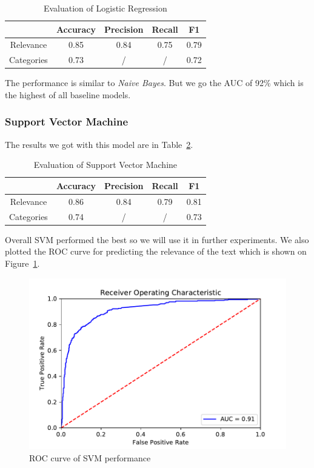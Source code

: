 \documentclass[11pt,a4paper]{article}
\begin{document}
\begin{table}[h]
    \centering
    \begin{tabular}{ c | c c c c } 
         & Accuracy & Precision & Recall & F1 \\ 
         \hline
         Relevance & 0.85 & 0.84 & 0.75 & 0.79 \\
         Categories & 0.73 & / & / & 0.72 \\
    \end{tabular}
    \caption{Evaluation of Logistic Regression}
    \label{tab:tab2}
\end{table}

The performance is similar to \textit{Naive Bayes}.
But we go the AUC of 92\% which is the highest of all baseline models.

\subsubsection{Support Vector Machine}
The results we got with this model are in Table~\ref{tab:tab3}.

\begin{table}[h]
    \centering
    \begin{tabular}{ c | c c c c } 
         & Accuracy & Precision & Recall & F1 \\ 
         \hline
        Relevance & 0.86 & 0.84 & 0.79 & 0.81 \\ 
        Categories & 0.74 & / & / & 0.73 \\
    \end{tabular}
    \caption{Evaluation of Support Vector Machine}
    \label{tab:tab3}
\end{table}

Overall SVM performed the best so we will use it in further experiments.
We also plotted the ROC curve for predicting the relevance of the text which is shown on Figure~\ref{fig:fig2}.

\begin{figure}[h]
    \centering
    \includegraphics[width=1.0\columnwidth]{Figures/rocsvm.pdf}
    \caption{ROC curve of SVM performance}
    \label{fig:fig2}
\end{figure}
\end{document}
